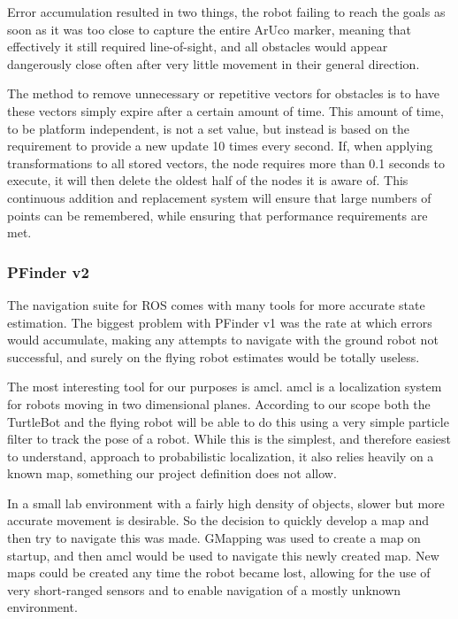 \documentclass{article}[12]
\begin{document}
 	Error accumulation resulted in two things, the robot failing to reach the goals as soon as it was too close to capture the entire ArUco marker, meaning that effectively it still required line-of-sight, and all obstacles would appear dangerously close often after very little movement in their general direction. 


	The method to remove unnecessary or repetitive vectors for obstacles is to have these vectors simply expire after a certain amount of time. This amount of time, to be platform independent, is not a set value, but instead is based on the requirement to provide a new update 10 times every second. If, when applying transformations to all stored vectors, the node requires more than 0.1 seconds to execute, it will then delete the oldest half of the nodes it is aware of. This continuous addition and replacement system will ensure that large numbers of points can be remembered, while ensuring that performance requirements are met.
	
	\subsubsection{PFinder v2}
	
	The navigation suite for ROS comes with many tools for more accurate state estimation. The biggest problem with PFinder v1 was the rate at which errors would accumulate, making any attempts to navigate with the ground robot not successful, and surely on the flying robot estimates would be totally useless.
	
	The most interesting tool for our purposes is amcl. amcl is a localization system for robots moving in two dimensional planes. According to our scope both the TurtleBot and the flying robot will be able to do this using a very simple particle filter to track the pose of a robot. While this is the simplest, and therefore easiest to understand, approach to probabilistic localization, it also relies heavily on a known map, something our project definition does not allow.
	
	In a small lab environment with a fairly high density of objects, slower but more accurate movement is desirable. So the decision to quickly develop a map and then try to navigate this was made. GMapping was used to create a map on startup, and then amcl would be used to navigate this newly created map. New maps could be created any time the robot became lost, allowing for the use of very short-ranged sensors and to enable navigation of a mostly unknown environment.
	
\end{document}
